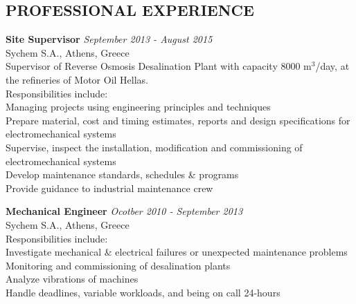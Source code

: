 \documentclass[11pt]{res} %
\begin{document}
\begin{resume}
\vspace{0.9in} %



\section{PROFESSIONAL EXPERIENCE} 
\vspace{8pt} %

\small\textbf{Site Supervisor} \hfill {\sl September 2013 - August 2015} \\
Sychem S.A., Athens, Greece\\
Supervisor of Reverse Osmosis Desalination Plant with capacity 8000 m$^3$/day, at the refineries of Motor Oil Hellas.\\
Responsibilities include:\\
 Managing projects using engineering principles and techniques\\
 Prepare material, cost and timing estimates, reports and design specifications for electromechanical systems\\
 Supervise, inspect the installation, modification and commissioning of electromechanical systems \\
 Develop maintenance standards, schedules \& programs \\
 Provide guidance to industrial maintenance crew


\small\textbf{Mechanical Engineer} \hfill {\sl Ocotber 2010 - September 2013} \\
Sychem S.A., Athens, Greece\\
Responsibilities include:\\
 Investigate mechanical \& electrical failures or unexpected maintenance problems\\
 Monitoring and commissioning of desalination plants\\
 Analyze vibrations of machines\\
 Handle deadlines, variable workloads, and being on call 24-hours


\end{resume}
\end{document}
